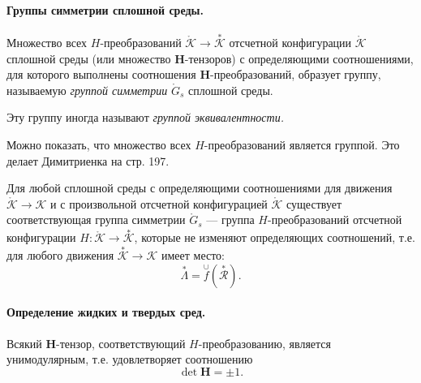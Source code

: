 
\paragraph{Группы симметрии сплошной среды.}

\begin{definition*}
	Множество всех $H$-преобразований $\mathring{\mathcal{K}} \to \overset{\ast}{\mathcal{K}}$ отсчетной конфигурации $\mathring{\mathcal{K}}$ сплошной среды (или множество $\mathbf{H}$-тензоров) с определяющими соотношениями, для которого выполнены соотношения $\mathbf{H}$-преобразований, образует группу, называемую \textit{группой симметрии} $\mathring{G}_{s}$ сплошной среды. 
	
	Эту группу иногда называют \textit{группой эквивалентности.}
\end{definition*}

\begin{utv*}
	Можно показать, что множество всех $H$-преобразований является группой. Это делает Димитриенка на стр. 197.
\end{utv*}

\begin{axiom*}
	Для любой сплошной среды с определяющими соотношениями для движения $\mathring{\mathcal{K}} \to \mathcal{K}$ и с произвольной отсчетной конфигурацией $\mathring{\mathcal{K}}$ существует соответствующая группа симметрии $\mathring{G}_{s}$ --- группа $H$-преобразований отсчетной конфигурации $H : \mathring{\mathcal{K}} \to \overset{\ast}{\mathcal{K}}$, которые не изменяют определяющих соотношений, т.е. для любого движения $\overset{\ast}{\mathcal{K}} \to \mathcal{K}$ имеет место:
	\begin{equation*}
		\overset{\ast}{\Lambda} = \overset{\cup}{f}(\overset{\ast}{\mathcal{R}}).
	\end{equation*} 
\end{axiom*}

\paragraph{Определение жидких и твердых сред.} 

\begin{theorem*}
	Всякий $\mathbf{H}$-тензор, соответствующий $H$-преобразованию, является унимодулярным, т.е. удовлетворяет соотношению 
	\begin{equation*}
		\det{\mathbf{H}} = \pm 1.
	\end{equation*}
\end{theorem*}

